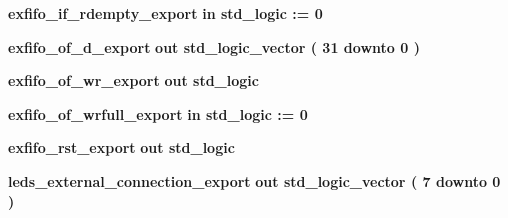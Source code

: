 \begin{DoxyCompactItemize}
{\bf exfifo\+\_\+if\+\_\+rdempty\+\_\+export}  {\bfseries {\bfseries \textcolor{keywordflow}{in}\textcolor{vhdlchar}{ }}} {\bfseries \textcolor{comment}{std\+\_\+logic}\textcolor{vhdlchar}{ }\textcolor{vhdlchar}{ }\textcolor{vhdlchar}{\+:}\textcolor{vhdlchar}{=}\textcolor{vhdlchar}{ }\textcolor{vhdlchar}{ }\textcolor{vhdlchar}{\textquotesingle{}}\textcolor{vhdlchar}{ } \textcolor{vhdldigit}{0} \textcolor{vhdlchar}{ }\textcolor{vhdlchar}{\textquotesingle{}}\textcolor{vhdlchar}{ }} 
\item 
{\bf exfifo\+\_\+of\+\_\+d\+\_\+export}  {\bfseries {\bfseries \textcolor{keywordflow}{out}\textcolor{vhdlchar}{ }}} {\bfseries \textcolor{comment}{std\+\_\+logic\+\_\+vector}\textcolor{vhdlchar}{ }\textcolor{vhdlchar}{(}\textcolor{vhdlchar}{ }\textcolor{vhdlchar}{ } \textcolor{vhdldigit}{31} \textcolor{vhdlchar}{ }\textcolor{keywordflow}{downto}\textcolor{vhdlchar}{ }\textcolor{vhdlchar}{ } \textcolor{vhdldigit}{0} \textcolor{vhdlchar}{ }\textcolor{vhdlchar}{)}\textcolor{vhdlchar}{ }} 
\item 
{\bf exfifo\+\_\+of\+\_\+wr\+\_\+export}  {\bfseries {\bfseries \textcolor{keywordflow}{out}\textcolor{vhdlchar}{ }}} {\bfseries \textcolor{comment}{std\+\_\+logic}\textcolor{vhdlchar}{ }} 
\item 
{\bf exfifo\+\_\+of\+\_\+wrfull\+\_\+export}  {\bfseries {\bfseries \textcolor{keywordflow}{in}\textcolor{vhdlchar}{ }}} {\bfseries \textcolor{comment}{std\+\_\+logic}\textcolor{vhdlchar}{ }\textcolor{vhdlchar}{ }\textcolor{vhdlchar}{\+:}\textcolor{vhdlchar}{=}\textcolor{vhdlchar}{ }\textcolor{vhdlchar}{ }\textcolor{vhdlchar}{\textquotesingle{}}\textcolor{vhdlchar}{ } \textcolor{vhdldigit}{0} \textcolor{vhdlchar}{ }\textcolor{vhdlchar}{\textquotesingle{}}\textcolor{vhdlchar}{ }} 
\item 
{\bf exfifo\+\_\+rst\+\_\+export}  {\bfseries {\bfseries \textcolor{keywordflow}{out}\textcolor{vhdlchar}{ }}} {\bfseries \textcolor{comment}{std\+\_\+logic}\textcolor{vhdlchar}{ }} 
\item 
{\bf leds\+\_\+external\+\_\+connection\+\_\+export}  {\bfseries {\bfseries \textcolor{keywordflow}{out}\textcolor{vhdlchar}{ }}} {\bfseries \textcolor{comment}{std\+\_\+logic\+\_\+vector}\textcolor{vhdlchar}{ }\textcolor{vhdlchar}{(}\textcolor{vhdlchar}{ }\textcolor{vhdlchar}{ } \textcolor{vhdldigit}{7} \textcolor{vhdlchar}{ }\textcolor{keywordflow}{downto}\textcolor{vhdlchar}{ }\textcolor{vhdlchar}{ } \textcolor{vhdldigit}{0} \textcolor{vhdlchar}{ }\textcolor{vhdlchar}{)}\textcolor{vhdlchar}{ }} 
\item 

\end{DoxyCompactItemize}
